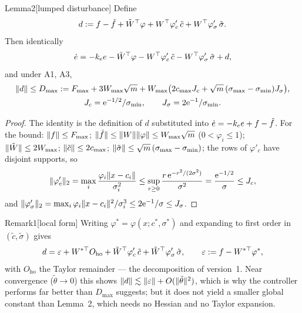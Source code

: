 \begin{thm}{Lemma}{2}[lumped disturbance]
Define
\begin{equation}\label{eq:part1:d}
d:=f-\hat f+\tilde W^\top\varphi+W^\top\varphi'_c\,\tilde c+W^\top\varphi'_\sigma\,\tilde\sigma.
\end{equation}
Then identically
\begin{equation}\label{eq:part1:edot}
\dot e=-k_e e-\tilde W^\top\varphi-W^\top\varphi'_c\,\tilde c-W^\top\varphi'_\sigma\,\tilde\sigma+d,
\end{equation}
and under A1, A3,
\begin{gather}
\lVert d\rVert\le D_{\max}:=F_{\max}+3W_{\max}\sqrt m
  +W_{\max}\bigl(2c_{\max}J_c+\sqrt m\,(\sigma_{\max}-\sigma_{\min})J_\sigma\bigr),\label{eq:part1:Dmax}\\
J_c=\mathrm{e}^{-1/2}/\sigma_{\min},\qquad J_\sigma=2\mathrm{e}^{-1}/\sigma_{\min}.\notag
\end{gather}
\end{thm}

\begin{proof}
The identity is the definition of $d$ substituted into $\dot e=-k_e e+f-\hat f$. For the bound: $\lVert f\rVert\le F_{\max}$;
$\lVert \hat f\rVert\le\lVert W\rVert\lVert \varphi\rVert\le W_{\max}\sqrt m$ ($0<\varphi_i\le1$); $\lVert \tilde W\rVert\le2W_{\max}$;
$\lVert \tilde c\rVert\le2c_{\max}$; $\lVert \tilde\sigma\rVert\le\sqrt m\,(\sigma_{\max}-\sigma_{\min})$; the rows of $\varphi'_c$
have disjoint supports, so
\[
\lVert \varphi'_c\rVert_2=\max_i\frac{\varphi_i\lVert x-c_i\rVert}{\sigma_i^2}
\le\sup_{r\ge0}\frac{r\,\mathrm{e}^{-r^2/(2\sigma^2)}}{\sigma^2}=\frac{\mathrm{e}^{-1/2}}{\sigma}\le J_c,
\]
and $\lVert \varphi'_\sigma\rVert_2=\max_i\varphi_i\lVert x-c_i\rVert^2/\sigma_i^3\le2\mathrm{e}^{-1}/\sigma\le J_\sigma$.
\end{proof}

\begin{rmk}{Remark}{1}[local form]
Writing $\varphi^*=\varphi(x;c^*,\sigma^*)$ and expanding to first order in $(\tilde c,\tilde\sigma)$ gives
\[
d=\varepsilon+W^{*\top}O_{\mathrm{ho}}+\tilde W^\top\varphi'_c\,\tilde c+\tilde W^\top\varphi'_\sigma\,\tilde\sigma,
\qquad \varepsilon:=f-W^{*\top}\varphi^*,
\]
with $O_{\mathrm{ho}}$ the Taylor remainder --- the decomposition of version~1. Near convergence
($\tilde\theta\to0$) this shows $\lVert d\rVert\lesssim\lVert \varepsilon\rVert+O(\lVert \tilde\theta\rVert^2)$, which is why the
controller performs far better than $D_{\max}$ suggests; but it does not yield a smaller global constant than Lemma~2,
which needs no Hessian and no Taylor expansion.
\end{rmk}

